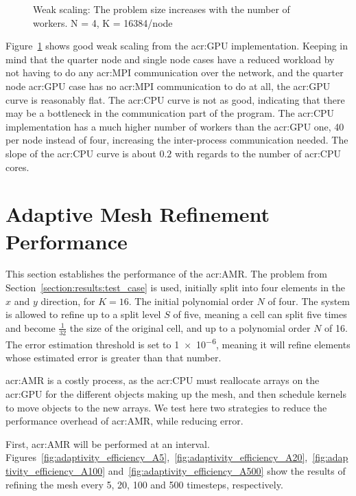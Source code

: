 \begin{figure}[H]
	\centering
	
	\caption{Weak scaling: The problem size increases with the number of workers. N = 4, K = 16384/node}\label{fig:weak_scaling}
\end{figure}

Figure~\ref{fig:weak_scaling} shows good weak scaling from the \acrshort{acr:GPU} implementation.
Keeping in mind that the quarter node and single node cases have a reduced workload by not having to
do any \acrshort{acr:MPI} communication over the network, and the quarter node \acrshort{acr:GPU}
case has no \acrshort{acr:MPI} communication to do at all, the \acrshort{acr:GPU} curve is
reasonably flat. The \acrshort{acr:CPU} curve is not as good, indicating that there may be a
bottleneck in the communication part of the program. The \acrshort{acr:CPU} implementation has a
much higher number of workers than the \acrshort{acr:GPU} one, 40 per node instead of four,
increasing the inter-process communication needed. The slope of the \acrshort{acr:CPU} curve is
about \(0.2\) with regards to the number of \acrshort{acr:CPU} cores. 

\section{Adaptive Mesh Refinement Performance}\label{section:results:adaptivity_performance}

This section establishes the performance of the \acrlong{acr:AMR}. The problem from
Section~\ref{section:results:test_case} is used, initially split into four elements in the \(x\) and
\(y\) direction, for \(K = 16\). The initial polynomial order \(N\) of four. The system is allowed
to refine up to a split level \(S\) of five, meaning a cell can split five times and become \(
\frac{1}{32}\) the size of the original cell, and up to a polynomial order \(N\) of 16. The error
estimation threshold is set to \num{1e-6}, meaning it will refine elements whose estimated error is
greater than that number.

\Acrlong{acr:AMR} is a costly process, as the \acrshort{acr:CPU} must reallocate arrays on the
\acrshort{acr:GPU} for the different objects making up the mesh, and then schedule kernels to move
objects to the new arrays. We test here two strategies to reduce the performance overhead of
\acrlong{acr:AMR}, while reducing error. 

First, \acrlong{acr:AMR} will be performed at an interval.
Figures~\ref{fig:adaptivity_efficiency_A5},~\ref{fig:adaptivity_efficiency_A20},~\ref{fig:adaptivity_efficiency_A100}
and~\ref{fig:adaptivity_efficiency_A500} show the results of refining the mesh every 5, 20, 100 and
500 timesteps, respectively.

